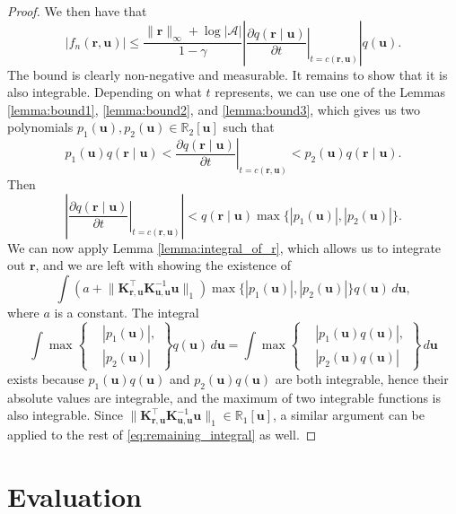 \documentclass{mpaper}
\newcommand{\vbound}{\frac{\rinf + \log|\mathcal{A}|}{1 - \gamma}}
\newcommand{\rinf}{\lVert \mathbf{r} \rVert_\infty}
\newcommand{\fn}{f_n(\mathbf{r}, \mathbf{u})}
\newcommand{\Kuu}{\mathbf{K}_{\mathbf{u},\mathbf{u}}}
\newcommand{\Kru}{\mathbf{K}_{\mathbf{r},\mathbf{u}}}
\begin{document}
\begin{proof}
  We then have that
  \[
    |\fn| \le \vbound \left| \left. \frac{\partial
          q(\mathbf{r} \mid \mathbf{u})}{\partial t} \right|_{t=c(\mathbf{r}, \mathbf{u})}
    \right| q(\mathbf{u}).
  \]
  The bound is clearly non-negative and measurable. It remains to show that it
  is also integrable. Depending on what $t$ represents, we can use one of the
  Lemmas \ref{lemma:bound1}, \ref{lemma:bound2}, and \ref{lemma:bound3}, which
  gives us two polynomials $p_1(\mathbf{u}), p_2(\mathbf{u}) \in
  \mathbb{R}_2[\mathbf{u}]$ such that
  \[
    p_1(\mathbf{u})q(\mathbf{r} \mid \mathbf{u}) < \left. \frac{\partial q(\mathbf{r} \mid \mathbf{u})}{\partial
        t} \right|_{t=c(\mathbf{r}, \mathbf{u})} < p_2(\mathbf{u})q(\mathbf{r} \mid \mathbf{u}).
  \]
  Then
  \[
    \left| \left. \frac{\partial q(\mathbf{r} \mid \mathbf{u})}{\partial t}
      \right|_{t=c(\mathbf{r}, \mathbf{u})} \right| < q(\mathbf{r} \mid \mathbf{u}) \max \{
    |p_1(\mathbf{u})|, |p_2(\mathbf{u})| \}.
  \]
  We can now apply Lemma \ref{lemma:integral_of_r}, which allows us to integrate
  out $\mathbf{r}$, and we are left with showing the existence of
  \begin{equation} \label{eq:remaining_integral}
    \int \left( a + \lVert \Kru^\intercal \Kuu^{-1} \mathbf{u} \rVert_1 \right) \max \{|p_1(\mathbf{u})|, |p_2(\mathbf{u})| \} q(\mathbf{u})\,d\mathbf{u},
  \end{equation}
  where $a$ is a constant. The integral
  \[
    \int \max \left\{
      \begin{aligned}
        &|p_1(\mathbf{u})|, \\
        &|p_2(\mathbf{u})|
      \end{aligned}
    \right\} q(\mathbf{u})\,d\mathbf{u} = \int \max \left\{
      \begin{aligned}
        &|p_1(\mathbf{u})q(\mathbf{u})|, \\
        &|p_2(\mathbf{u})q(\mathbf{u})|
      \end{aligned}
    \right\}\,d\mathbf{u}
  \]
  exists because $p_1(\mathbf{u})q(\mathbf{u})$ and
  $p_2(\mathbf{u})q(\mathbf{u})$ are both integrable, hence their absolute
  values are integrable, and the maximum of two integrable functions is also
  integrable. Since $\lVert \Kru^\intercal \Kuu^{-1} \mathbf{u} \rVert_1 \in
  \mathbb{R}_1[\mathbf{u}]$, a similar argument can be applied to the rest of
  \eqref{eq:remaining_integral} as well.
\end{proof}

\section{Evaluation} \label{sec:evaluation}
\end{document}
